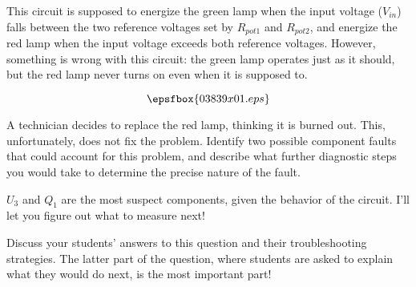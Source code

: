 

This circuit is supposed to energize the green lamp when the input voltage ($V_{in}$) falls between the two reference voltages set by $R_{pot1}$ and $R_{pot2}$, and energize the red lamp when the input voltage exceeds both reference voltages.  However, something is wrong with this circuit: the green lamp operates just as it should, but the red lamp never turns on even when it is supposed to.

$$\epsfbox{03839x01.eps}$$

A technician decides to replace the red lamp, thinking it is burned out.  This, unfortunately, does not fix the problem.  Identify two possible component faults that could account for this problem, and describe what further diagnostic steps you would take to determine the precise nature of the fault.







$U_3$ and $Q_1$ are the most suspect components, given the behavior of the circuit.  I'll let you figure out what to measure next!







Discuss your students' answers to this question and their troubleshooting strategies.  The latter part of the question, where students are asked to explain what they would do next, is the most important part!




